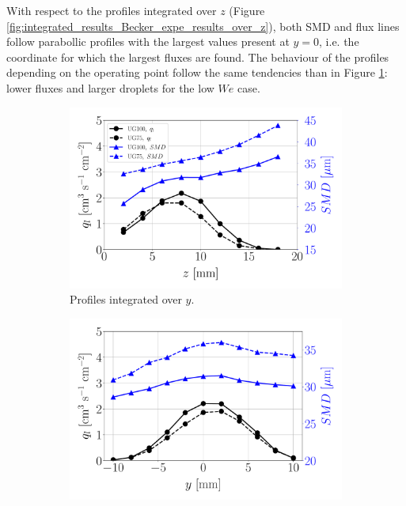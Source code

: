 With respect to the profiles integrated over $z$ (Figure \ref{fig:integrated_results_Becker_expe_results_over_z}), both SMD and flux lines follow parabollic profiles with the largest values present at $y = 0$, i.e. the coordinate for which the largest fluxes are found. The behaviour of the profiles depending on the operating point follow the same tendencies than in Figure \ref{fig:integrated_results_Becker_expe_results_over_y}: lower fluxes and larger droplets for the low $We$ case.



\begin{figure}[h!]
\flushleft
\begin{subfigure}[b]{0.45\textwidth}
	\flushleft
   \includegraphics[scale=0.275]{./part2_developments/figures_ch6_lagrangian_JICF/expe_results/integrated_fluxes_along_y}
   \caption{Profiles integrated over $y$.}
  \label{fig:integrated_results_Becker_expe_results_over_y} 
\end{subfigure}
\hspace{0.3in}
\begin{subfigure}[b]{0.45\textwidth}
	\centering
   \includegraphics[scale=0.275]{./part2_developments/figures_ch6_lagrangian_JICF/expe_results/integrated_fluxes_along_z}

\end{subfigure}
\end{figure}
